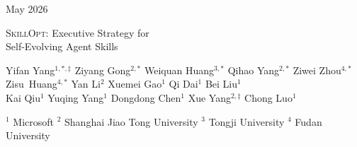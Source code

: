 \documentclass[11pt]{article}
\newcommand{\ourmethod}{\textsc{SkillOpt}\xspace}
\begin{document}
\thispagestyle{empty}

\noindent
\begin{minipage}[c]{0.5\linewidth}
\raggedright
\raisebox{-0.5\height}{\msftbrandmark}
\end{minipage}%
\begin{minipage}[c]{0.49\linewidth}
\raggedleft
{\msftdatefont\small\color{msftgray}May 2026}
\end{minipage}\par
\vspace{0.35em}
\noindent{\color{msftline}\rule{\linewidth}{0.8pt}\par}

\vspace{1.0em}
\begin{center}
{{\msfttitlefont\fontsize{21}{25}\selectfont\color{msftdark}
\ourmethod{}: Executive Strategy for\\
Self-Evolving Agent Skills\par}}
\vspace{1.25em}

{\normalsize\rmfamily\color{msftdark}
Yifan Yang$^{1,*,\ddagger}$ \hspace{0.6em}
Ziyang Gong$^{2,*}$ \hspace{0.6em}
Weiquan Huang$^{3,*}$ \hspace{0.6em}
Qihao Yang$^{2,*}$ \hspace{0.6em}
Ziwei Zhou$^{4,*}$\\[-0.1em]
Zisu~Huang$^{4,*}$ \hspace{0.6em}
Yan Li$^{2}$ \hspace{0.6em}
Xuemei Gao$^{1}$ \hspace{0.6em}
Qi Dai$^{1}$ \hspace{0.6em}
Bei Liu$^{1}$\\[-0.1em]
Kai Qiu$^{1}$ \hspace{0.6em}
Yuqing Yang$^{1}$ \hspace{0.6em}
Dongdong Chen$^{1}$ \hspace{0.6em}
Xue Yang$^{2,\ddagger}$ \hspace{0.6em}
Chong Luo$^{1}$\par
}
\vspace{0.22cm}

{\footnotesize\rmfamily\color{msftgray}
$^{1}$ Microsoft \quad
$^{2}$ Shanghai Jiao Tong University \quad
$^{3}$ Tongji University \quad
$^{4}$ Fudan University\par
}
\end{center}
\end{document}

